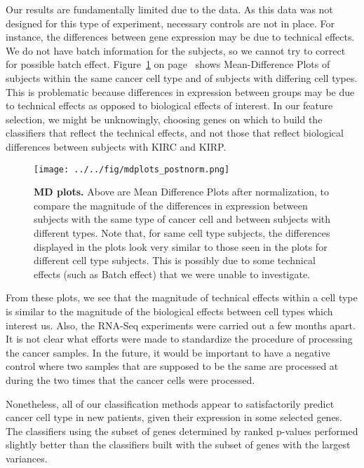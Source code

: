 Our results are fundamentally limited due to the data. As this data was not
designed for this type of experiment, necessary controls are not in place. For
instance, the differences between gene expression may be due to technical
effects. We do not have batch information for the subjects, so we cannot try to
correct for possible batch effect. Figure~\ref{fig:mdplot} on
page~\pageref{fig:mdplot} shows Mean-Difference Plots of subjects within the
same cancer cell type and of subjects with differing cell types.  This is
problematic because differences in expression between groups may be due to
technical effects as opposed to biological effects of interest.  In our feature
selection, we might be unknowingly, choosing genes on which to build the
classifiers that reflect the technical effects, and not those that reflect
biological differences between subjects with KIRC and KIRP.

\begin{figure}[H]
  \centering
    \texttt{[image: ../../fig/mdplots\_postnorm.png]}
\caption{\textbf{MD plots.} Above are Mean Difference Plots after normalization, to
  compare the magnitude of the differences in expression between subjects with
  the same type of cancer cell and between subjects with different types.  Note
  that, for same cell type subjects, the differences displayed in the plots look
  very similar to those seen in the plots for different cell type subjects. This
  is possibly due to some technical effects (such as Batch
  effect) that we were unable to investigate.}
   \label{fig:mdplot}
\end{figure}


From these plots, we see that the magnitude of technical effects within a cell
type is similar to the magnitude of the biological effects between cell types
which interest us. Also, the RNA-Seq experiments were carried out a few months
apart. It is not clear what efforts were made to standardize the procedure of
processing the cancer samples. In the future, it would be important to have a
negative control where two samples that are supposed to be the same are
processed at during the two times that the cancer cells were processed. 

Nonetheless, all of our classification methods appear to satisfactorily predict
cancer cell type in new patients, given their expression in some selected
genes. The classifiers using the subset of genes determined by ranked p-values
performed slightly better than the classifiers built with the subset of genes
with the largest variances.

